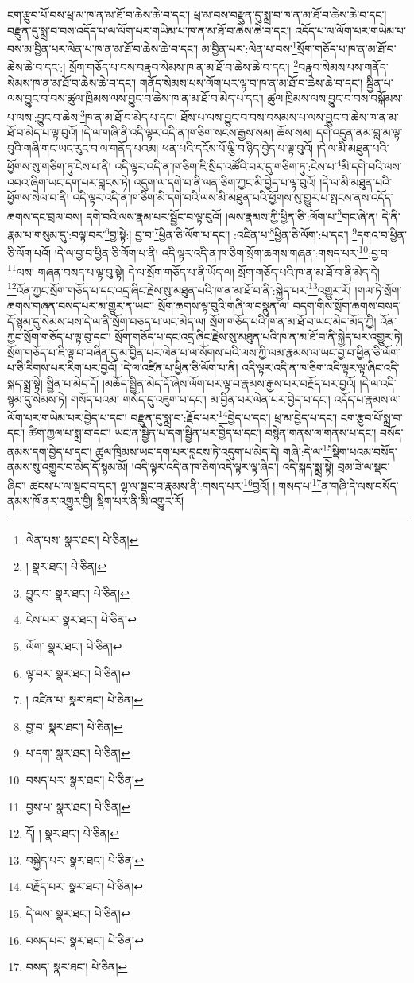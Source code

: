 ངག་རྩུབ་པོ་བས་ཕྲ་མ་ཁ་ན་མ་ཐོ་བ་ཆེས་ཆེ་བ་དང་། ཕྲ་མ་བས་བརྫུན་དུ་སྨྲ་བ་ཁ་ན་མ་ཐོ་བ་ཆེས་ཆེ་བ་དང་། བརྫུན་དུ་སྨྲ་བ་བས་འདོད་པ་ལ་ལོག་པར་གཡེམ་པ་ཁ་ན་མ་ཐོ་བ་ཆེས་ཆེ་བ་དང་། འདོད་པ་ལ་ལོག་པར་གཡེམ་པ་བས་མ་བྱིན་པར་ལེན་པ་ཁ་ན་མ་ཐོ་བ་ཆེས་ཆེ་བ་དང་། མ་བྱིན་པར་:ལེན་པ་བས་\footnote{ལེན་པས་  སྣར་ཐང་།  པེ་ཅིན། }སྲོག་གཅོད་པ་ཁ་ན་མ་ཐོ་བ་ཆེས་ཆེ་བ་དང་:། སྲོག་གཅོད་པ་བས་བརྣབ་སེམས་ཁ་ན་མ་ཐོ་བ་ཆེས་ཆེ་བ་དང་། \footnote{།    སྣར་ཐང་།  པེ་ཅིན། }བརྣབ་སེམས་པས་གནོད་སེམས་ཁ་ན་མ་ཐོ་བ་ཆེས་ཆེ་བ་དང་། གནོད་སེམས་པས་ལོག་པར་ལྟ་བ་ཁ་ན་མ་ཐོ་བ་ཆེས་ཆེ་བ་དང་། སྦྱིན་པ་ལས་བྱུང་བ་བས་ཚུལ་ཁྲིམས་ལས་བྱུང་བ་ཆེས་ཁ་ན་མ་ཐོ་བ་མེད་པ་དང་། ཚུལ་ཁྲིམས་ལས་བྱུང་བ་བས་བསྒོམས་པ་ལས་:བྱུང་བ་ཆེས་\footnote{བྱུང་བ་  སྣར་ཐང་།  པེ་ཅིན། }ཁ་ན་མ་ཐོ་བ་མེད་པ་དང་། ཐོས་པ་ལས་བྱུང་བ་བས་བསམས་པ་ལས་བྱུང་བ་ཆེས་ཁ་ན་མ་ཐོ་བ་མེད་པ་ལྟ་བུའོ། །དེ་ལ་གཞི་ནི་འདི་ལྟར་འདི་ན་ཁ་ཅིག་སངས་རྒྱས་སམ། ཆོས་སམ། དགེ་འདུན་ནམ་བླ་མ་ལྟ་བུའི་གཞི་གང་ཡང་རུང་བ་ལ་གནོད་པའམ། ཕན་པའི་དངོས་པོ་ལྕི་བ་ཉིད་བྱེད་པ་ལྟ་བུའོ། །དེ་ལ་མི་མཐུན་པའི་ཕྱོགས་སུ་གཅིག་ཏུ་ངེས་པ་ནི། འདི་ལྟར་འདི་ན་ཁ་ཅིག་ཇི་སྲིད་འཚོའི་བར་དུ་གཅིག་ཏུ་:ངེས་པ་\footnote{ངེས་པར་  སྣར་ཐང་།  པེ་ཅིན། }མི་དགེ་བའི་ལས་འབའ་ཞིག་ཡང་དག་པར་བླངས་ཏེ། འདུག་ལ་དགེ་བ་ནི་ལན་ཅིག་ཀྱང་མི་བྱེད་པ་ལྟ་བུའོ། །དེ་ལ་མི་མཐུན་པའི་ཕྱོགས་སེལ་བ་ནི། འདི་ལྟར་འདི་ན་ཁ་ཅིག་མི་དགེ་བའི་ལས་མི་མཐུན་པའི་ཕྱོགས་སུ་གྱུར་པ་སྤངས་ནས་འདོད་ཆགས་དང་བྲལ་བས། དགེ་བའི་ལས་རྣམ་པར་སྦྱོང་བ་ལྟ་བུའོ། །ལས་རྣམས་ཀྱི་ཕྱིན་ཅི་:ལོག་པ་\footnote{ལོག་  སྣར་ཐང་།  པེ་ཅིན། }གང་ཞེ་ན། དེ་ནི་རྣམ་པ་གསུམ་དུ་:བལྟ་བར་\footnote{ལྟ་བར་  སྣར་ཐང་།  པེ་ཅིན། }བྱ་སྟེ:། བྱ་བ་\footnote{།  འཛིན་པ་  སྣར་ཐང་།  པེ་ཅིན། }ཕྱིན་ཅི་ལོག་པ་དང་། :འཛིན་པ་\footnote{བྱ་བ་  སྣར་ཐང་།  པེ་ཅིན། }ཕྱིན་ཅི་ལོག་:པ་དང་། \footnote{པ་དག་  སྣར་ཐང་།  པེ་ཅིན། }དགའ་བ་ཕྱིན་ཅི་ལོག་པའོ། །དེ་ལ་བྱ་བ་ཕྱིན་ཅི་ལོག་པ་ནི། འདི་ལྟར་འདི་ན་ཁ་ཅིག་སྲོག་ཆགས་གཞན་:གསད་པར་\footnote{བསད་པར་  སྣར་ཐང་།  པེ་ཅིན། }:བྱ་བ་\footnote{བྱས་པ་  སྣར་ཐང་།  པེ་ཅིན། }ལས། གཞན་བསད་པ་ལྟ་བུ་སྟེ། དེ་ལ་སྲོག་གཅོད་པ་ནི་ཡོད་ལ། སྲོག་གཅོད་པའི་ཁ་ན་མ་ཐོ་བ་ནི་མེད་དེ། \footnote{དོ། །   སྣར་ཐང་།  པེ་ཅིན། }འོན་ཀྱང་སྲོག་གཅོད་པ་དང་འདྲ་ཞིང་རྗེས་སུ་མཐུན་པའི་ཁ་ན་མ་ཐོ་བ་ནི་:སྐྱེད་པར་\footnote{བསྐྱེད་པར་  སྣར་ཐང་།  པེ་ཅིན། }འགྱུར་རོ། །གལ་ཏེ་སྲོག་ཆགས་གཞན་བསད་པར་མ་གྱུར་ན་ཡང་། སྲོག་ཆགས་ལྟ་བུའི་གཞི་ལ་བསྣུན་ལ། བདག་གིས་སྲོག་ཆགས་བསད་དོ་སྙམ་དུ་སེམས་པས་དེ་ལ་ནི་སྲོག་བཅད་པ་ཡང་མེད་ལ། སྲོག་གཅོད་པའི་ཁ་ན་མ་ཐོ་བ་ཡང་མེད་མོད་ཀྱི། འོན་ཀྱང་སྲོག་གཅོད་པ་ལྟ་བུ་དང་། སྲོག་གཅོད་པ་དང་འདྲ་ཞིང་རྗེས་སུ་མཐུན་པའི་ཁ་ན་མ་ཐོ་བ་ནི་སྐྱེད་པར་འགྱུར་ཏེ། སྲོག་གཅོད་པ་ཇི་ལྟ་བ་བཞིན་དུ་མ་བྱིན་པར་ལེན་པ་ལ་སོགས་པའི་ལས་ཀྱི་ལམ་རྣམས་ལ་ཡང་བྱ་བ་ཕྱིན་ཅི་ལོག་པ་ཅི་རིགས་པར་རིག་པར་བྱའོ། །དེ་ལ་འཛིན་པ་ཕྱིན་ཅི་ལོག་པ་ནི། འདི་ལྟར་འདི་ན་ཁ་ཅིག་འདི་ལྟར་ལྟ་ཞིང་འདི་སྐད་སྨྲ་སྟེ། སྦྱིན་པ་མེད་དོ། །མཆོད་སྦྱིན་མེད་དོ་ཞེས་ལོག་པར་ལྟ་བ་རྣམས་རྒྱས་པར་བརྗོད་པར་བྱའོ། །དེ་ལ་འདི་སྙམ་དུ་སེམས་ཏེ། གསོད་པའམ། གསོད་དུ་འཇུག་པ་དང་། མ་བྱིན་པར་ལེན་པར་བྱེད་པ་དང་། འདོད་པ་རྣམས་ལ་ལོག་པར་གཡེམ་པར་བྱེད་པ་དང་། བརྫུན་དུ་སྨྲ་བ་:རྗོད་པར་\footnote{བརྗོད་པར་  སྣར་ཐང་།  པེ་ཅིན། }བྱེད་པ་དང་། ཕྲ་མ་བྱེད་པ་དང་། ངག་རྩུབ་པོ་སྨྲ་བ་དང་། ཚིག་ཀྱལ་པ་སྨྲ་བ་དང་། ཡང་ན་སྦྱིན་པ་དག་སྦྱིན་པར་བྱེད་པ་དང་། བསྙེན་གནས་ལ་གནས་པ་དང་། བསོད་ནམས་དག་བྱེད་པ་དང་། ཚུལ་ཁྲིམས་ཡང་དག་པར་བླངས་ཏེ་འདུག་པ་མེད་དེ། གཞི་:དེ་ལ་\footnote{དེ་ལས་  སྣར་ཐང་།  པེ་ཅིན། }སྡིག་པའམ་བསོད་ནམས་སུ་འགྱུར་བ་མེད་དོ་སྙམ་མོ། །འདི་ལྟར་འདི་ན་ཁ་ཅིག་འདི་ལྟར་ལྟ་ཞིང་། འདི་སྐད་སྨྲ་སྟེ། བྲམ་ཟེ་ལ་སྡང་ཞིང་། ཚངས་པ་ལ་སྡང་བ་དང་། ལྷ་ལ་སྡང་བ་རྣམས་ནི་:གསད་པར་\footnote{བསད་པར་  སྣར་ཐང་།  པེ་ཅིན། }བྱའོ། །:གསད་པ་\footnote{བསད་  སྣར་ཐང་།  པེ་ཅིན། }ན་གཞི་དེ་ལས་བསོད་ནམས་ཁོ་ནར་འགྱུར་གྱི། སྡིག་པར་ནི་མི་འགྱུར་རོ། 